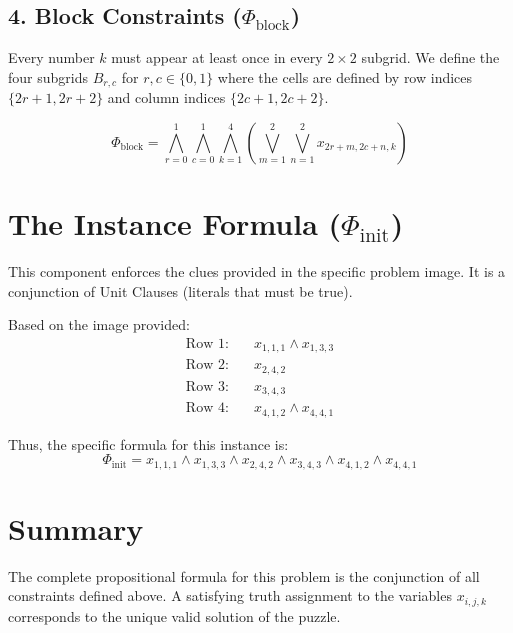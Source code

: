 \documentclass[12pt,a4paper]{article}
\begin{document}
\subsection{4. Block Constraints ($\Phi_{\text{block}}$)}
Every number $k$ must appear at least once in every $2 \times 2$ subgrid. We define the four subgrids $B_{r,c}$ for $r,c \in \{0,1\}$ where the cells are defined by row indices $\{2r+1, 2r+2\}$ and column indices $\{2c+1, 2c+2\}$.

$$ \Phi_{\text{block}} = \bigwedge_{r=0}^1 \bigwedge_{c=0}^1 \bigwedge_{k=1}^4 \left( \bigvee_{m=1}^2 \bigvee_{n=1}^2 x_{2r+m, 2c+n, k} \right) $$

\section{The Instance Formula ($\Phi_{\text{init}}$)}
This component enforces the clues provided in the specific problem image. It is a conjunction of Unit Clauses (literals that must be true).

Based on the image provided:
\begin{align*}
    \text{Row 1:} & \quad x_{1,1,1} \land x_{1,3,3} \\
    \text{Row 2:} & \quad x_{2,4,2} \\
    \text{Row 3:} & \quad x_{3,4,3} \\
    \text{Row 4:} & \quad x_{4,1,2} \land x_{4,4,1}
\end{align*}

Thus, the specific formula for this instance is:
$$ \Phi_{\text{init}} = x_{1,1,1} \land x_{1,3,3} \land x_{2,4,2} \land x_{3,4,3} \land x_{4,1,2} \land x_{4,4,1} $$

\section{Summary}
The complete propositional formula for this problem is the conjunction of all constraints defined above. A satisfying truth assignment to the variables $x_{i,j,k}$ corresponds to the unique valid solution of the puzzle.
\end{document}

